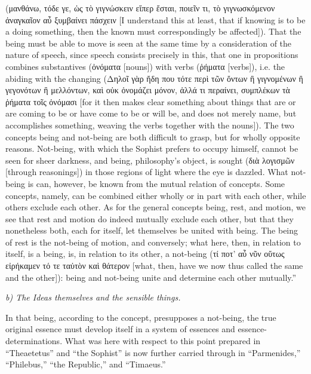 \documentclass[12pt]{book}
\begin{document}
(μανθάνω, τόδε γε, ὡς τὸ γιγνώσκειν εἴπερ ἔσται, ποιεῖν τι, τὸ γιγνωσκόμενον ἀναγκαῖον αὖ ξυμβαίνει
πάσχειν [I understand this at least, that if knowing is to be a doing something, then the known must
correspondingly be affected]). That the being must be able to move is seen at the same time by a
consideration of the nature of speech, since speech consists precisely in this, that one in
propositions combines substantives (ὀνόματα [nouns]) with verbs (ῥήματα [verbs]), i.e. the abiding
with the changing (Δηλοῖ γὰρ ἤδη που τότε περὶ τῶν ὄντων ἢ γιγνομένων ἢ γεγονότων ἢ μελλόντων, καὶ
οὐκ ὀνομάζει μόνον, ἀλλά τι περαίνει, συμπλέκων τὰ ῥήματα τοῖς ὀνόμασι [for it then makes clear
something about things that are or are coming to be or have come to be or will be, and does not
merely name, but accomplishes something, weaving the verbs together with the nouns]). The two
concepts being and not-being are both difficult to grasp, but for wholly opposite reasons.
Not-being, with which the Sophist prefers to occupy himself, cannot be seen for sheer darkness, and
being, philosophy's object, is sought (διὰ λογισμῶν [through reasonings]) in those regions of light
where the eye is dazzled. What not-being is can, however, be known from the mutual relation of
concepts. Some concepts, namely, can be combined either wholly or in part with each other, while
others exclude each other. As for the general concepts being, rest, and motion, we see that rest
and motion do indeed mutually exclude each other, but that they nonetheless both, each for itself,
let themselves be united with being. The being of rest is the not-being of motion, and conversely;
what here, then, in relation to itself, is a being, is, in relation to its other, a not-being (τί
ποτ' αὖ νῦν οὕτως εἰρήκαμεν τό τε ταὐτὸν καὶ θάτερον [what, then, have we now thus called the same
and the other]): being and not-being unite and determine each other mutually.''

\emph{b) The Ideas themselves and the sensible things.}

In that being, according to the concept, presupposes a not-being, the true original essence must
develop itself in a system of essences and essence-determinations. What was here with respect to
this point prepared in ``Theaetetus'' and ``the Sophist'' is now further carried through in
``Parmenides,'' ``Philebus,'' ``the Republic,'' and ``Timaeus.''
\end{document}
